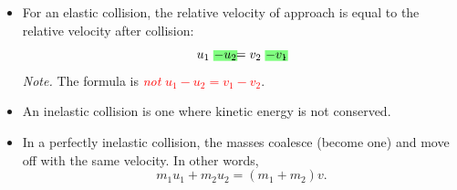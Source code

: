 \documentclass[oneside]{book}
\begin{document}
\begin{itemize}
\begin{table}[H]
\begin{tabular}{ScScSc}
            \bottomrule
        \end{tabular}
        \caption{Special cases of elastic collisions.}
        \label{table:elastic-collisions}
    \end{table}
    \item For an elastic collision, the relative velocity of approach is equal to the relative velocity after collision:
    \[u_1\highlight[green!50]{-u_2}=v_2\highlight[green!50]{-v_1}.\]
    \emph{Note.} The formula is \textcolor{red}{\emph{not} \(u_1-u_2=v_1-v_2\)}.
    \item An inelastic collision is one where kinetic energy is not conserved. 
    \item In a perfectly inelastic collision, the masses coalesce (become one) and move off with the same velocity. In other words,
    \[m_1u_1+m_2u_2=(m_1+m_2)v.\]
\end{itemize}
\end{document}

